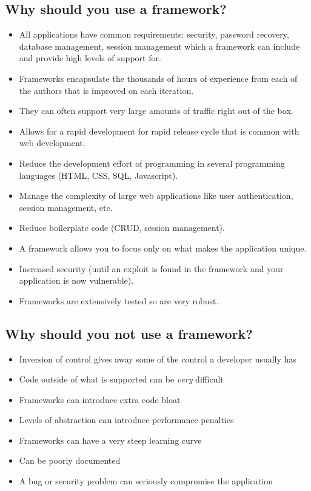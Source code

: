 \subsection{Why should you use a framework?}\label{sub:why_frameworks}

\begin{itemize}
	\item All applications have common requirements: security, password recovery, database management, session management which a framework can include and provide high levels of support for.
	\item Frameworks encapsulate the thousands of hours of experience from each of the authors that is improved on each iteration.
	\item They can often support very large amounts of traffic right out of the box.
	\item Allows for a rapid development for rapid release cycle that is common with web development.
	\item Reduce the development effort of programming in several programming languages (HTML, CSS, SQL, Javascript).
	\item Manage the complexity of large web applications like user authentication, session management, etc.
	\item Reduce boilerplate code (CRUD, session management).
	\item A framework allows you to focus only on what makes the application unique.
	\item Increased security (until an exploit is found in the framework and your application is now vulnerable).
	\item Frameworks are extensively tested so are very robust.
\end{itemize}

\subsection{Why should you not use a framework?}\label{sub:why_should_you_not_use_a_framework_}

\begin{itemize}
	\item Inversion of control gives away some of the control a developer usually has
	\item Code outside of what is supported can be \emph{very} difficult
	\item Frameworks can introduce extra code bloat
	\item Levels of abstraction can introduce performance penalties
	\item Frameworks can have a very steep learning curve
	\item Can be poorly documented
	\item A bug or security problem can seriously compromise the application
\end{itemize}

